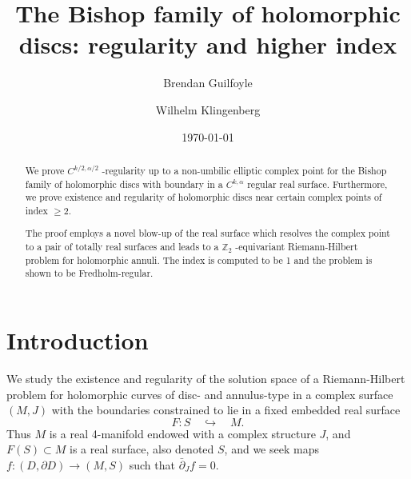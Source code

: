 \documentclass{amsart}
\newcommand{\be}{\begin{equation}}
\newcommand{\ee}{\end{equation}}
\begin{document}
\setlength{\parindent}{15pt} 
\setlength{\parskip}{0.2mm}

\title[The Bishop family of holomorphic discs]{The Bishop family of holomorphic discs: regularity and higher index}
\author{Brendan Guilfoyle}
\address{Brendan Guilfoyle\\
          Department of Technology, Engineering and Mathematics\\
          Faulty of Science and Informatics \\
          Munster Technological University\\
          Tralee\\
          Co. Kerry\\
          Ireland.}
\author{Wilhelm Klingenberg}
\address{Wilhelm Klingenberg\\
 Department of Mathematical Sciences\\
 University of Durham\\
 Durham DH1 3LE\\
 United Kingdom.}

\begin{abstract}
We prove $C^{k/2,\alpha/2}$ -regularity  up to a non-umbilic elliptic complex point for the Bishop family of holomorphic discs with boundary in a $C^{k,\alpha}$  regular real surface. Furthermore, we prove existence and regularity  of holomorphic discs near certain complex points of index $\ge 2$. 

The proof employs a novel blow-up of the real surface which resolves the complex point to a pair of totally real surfaces and leads to a $\mathbb{Z}_2$ -equivariant  Riemann-Hilbert problem for holomorphic annuli. The index is computed to be 1 and the problem is shown to be Fredholm-regular.
\end{abstract} 

\date{\today}
\maketitle
\setcounter{section}{0} 

\section{Introduction}
\noindent
We study the existence and regularity of the solution space of a Riemann-Hilbert problem for  holomorphic curves of disc- and annulus-type in a complex surface $(M,J)$ with the boundaries constrained to lie in a fixed embedded real surface
\be\label{e:1}
  F:  S \quad \hookrightarrow \quad M.
\ee
Thus $M$ is a real 4-manifold endowed with a complex structure $J$, and $F(S) \subset M$ is a real surface, also denoted $S$, and we seek maps $f:(D,\partial D)\rightarrow(M,S)$ such that $\bar{\partial}_Jf=0$. 
\end{document}

